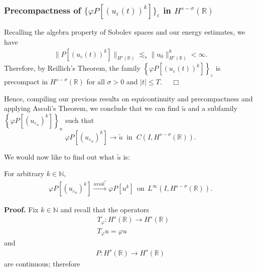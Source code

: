 \documentclass{beamer}
\newcommand{\rr}{\mathbb{R}}
\newcommand{\ee}{\varepsilon}
\begin{document}
    \begin{frame}
      \frametitle{Precompactness of $\{\varphi P [(u_\ee(t))^k]\}_\ee$ in
		$H^{s-\sigma  }(\rr)$}
		Recalling the algebra property of Sobolev
		spaces and our energy estimates, we have
		\begin{equation*}
			\begin{split}
			\|P [(u_\ee(t))^k]\|_{H^{s}(\rr)}
			\lesssim_s \|u_0 \|^k_{H^s(\rr)} < \infty.
			\end{split}
		\end{equation*}
		Therefore, by Reillich's Theorem, the family $\left\{
		\varphi P [(u_\ee(t))^k] \right\}_\ee$ is
		precompact in $H^{s- \sigma }(\rr)$ for all $\sigma > 0$ and $|t| \le T$. $\quad
		\Box$ 
		\vskip0.1in
  \end{frame}
  \begin{frame}
		Hence, compiling our previous results on equicontinuity and precompactness
		and applying Ascoli's Theorem, we
		conclude that we can find $\tilde{u}$ and a subfamily 
		\\ $\left\{
		\varphi P [(u_{\ee_n})^k]
		\right\}_n$ such that
		\begin{equation}
			\label{hhstrong-conv-of-u_ep}
			\varphi P [(u_{\ee_n})^k] \to \tilde{u}
			\; \; \text{in} \; \; C(I, H^{s-\sigma}(\rr)).
		\end{equation}
		
		\vskip0.1in
		We would now like to find out what $\tilde{u}$ is:
  \end{frame}
  \begin{frame}
		\vskip0.1in
		\begin{lemma}
			\label{hhlem:crit-conv}
			For arbitrary $k \in \mathbb{N}$,
			\begin{equation}
				\begin{split}
					\varphi P [(u_{\ee_n})^k] \xrightarrow{weak^*}
					\varphi P [u^k] \ \ \text{on} \ \ L^\infty(I,
					H^{s-\sigma}(\rr)).
					\label{hhcrit-conv-est}
				\end{split}
			\end{equation}
		\end{lemma}
		{\bf Proof.} 
		Fix $k \in \mathbb{N}$ and recall that the operators 
		\begin{equation*}
			\begin{split}
			 & T_\varphi: H^s(\rr) \to H^s(\rr)\\
			 & T_\varphi u = \varphi u
		\end{split}
	\end{equation*}
and 
\begin{equation*}
	\begin{split}
		P:H^s(\rr) \to H^s(\rr)
	\end{split}
\end{equation*}
	are continuous; therefore 
\end{frame}
\end{document}
